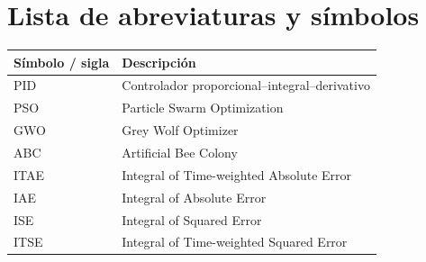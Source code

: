 \chapter*{Lista de abreviaturas y símbolos}

\begin{longtable}{p{}p{}}
\toprule
\textbf{Símbolo / sigla} & \textbf{Descripción} \\
\midrule
PID & Controlador proporcional--integral--derivativo \\
PSO & Particle Swarm Optimization \\
GWO & Grey Wolf Optimizer \\
ABC & Artificial Bee Colony \\
ITAE & Integral of Time-weighted Absolute Error \\
IAE & Integral of Absolute Error \\
ISE & Integral of Squared Error \\
ITSE & Integral of Time-weighted Squared Error \\
\bottomrule
\end{longtable}
